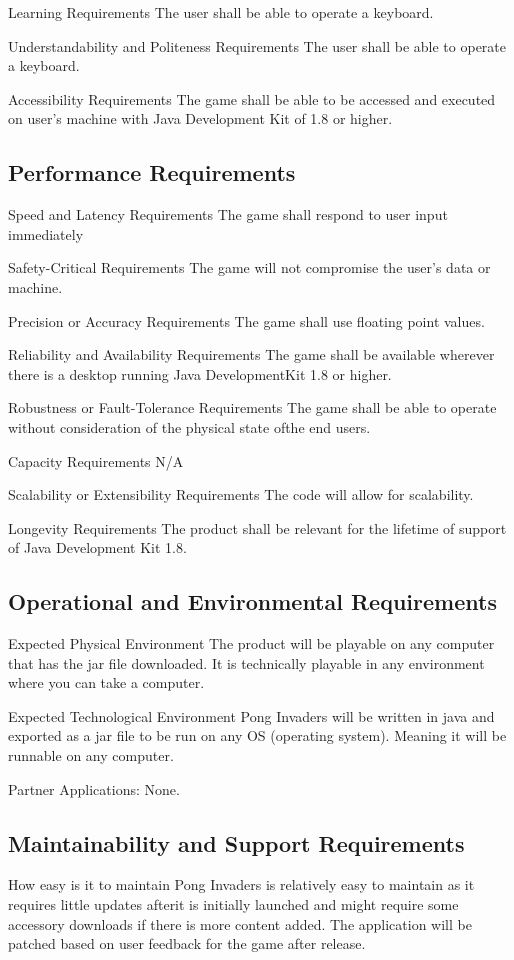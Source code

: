 \documentclass[12pt, titlepage]{article}
\begin{document}
Learning Requirements 
The user shall be able to operate a keyboard.

Understandability and Politeness Requirements
The user shall be able to operate a keyboard.

Accessibility Requirements 
The game shall be able to be accessed and executed on user’s machine with Java
Development Kit of 1.8 or higher.

\subsection{Performance Requirements}
Speed and Latency Requirements 
The game shall respond to user input immediately

Safety-Critical Requirements 
The game will not compromise the user’s data or machine. 

Precision or Accuracy Requirements 
The game shall use floating point values. 

Reliability and Availability Requirements
The game shall be available wherever there is a desktop running Java
DevelopmentKit 1.8 or higher.

Robustness or Fault-Tolerance Requirements 
The game shall be able to operate without consideration of the physical state
ofthe end users.

Capacity Requirements 
N/A

Scalability or Extensibility Requirements 
The code will allow for scalability.

Longevity Requirements 
The product shall be relevant for the lifetime of support of Java Development
Kit 1.8.


\subsection{Operational and Environmental Requirements}
Expected Physical Environment
The product will be playable on any computer that has the jar file downloaded.
It is technically playable in any environment where you can take a computer.
 
Expected Technological Environment
Pong Invaders will be written in java and exported as a jar file to be run on
any OS (operating system). Meaning it will be runnable on any computer.

Partner Applications:
None.


\subsection{Maintainability and Support Requirements}
How easy is it to maintain
Pong Invaders is relatively easy to maintain as it requires little updates
afterit is initially launched and might require some accessory downloads if
there is
more content added. The application will be patched based on user feedback for
the game after release.
 
\end{document}
